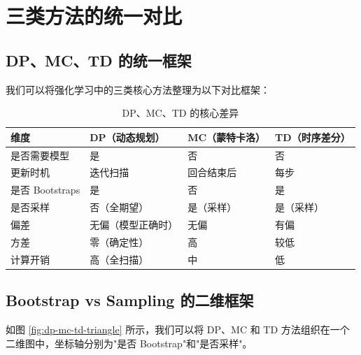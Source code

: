 \section{三类方法的统一对比}

\subsection{DP、MC、TD 的统一框架}

我们可以将强化学习中的三类核心方法整理为以下对比框架：

\begin{table}[H]
\centering
\caption{DP、MC、TD 的核心差异}
\begin{tabular}{@{}p{3cm}p{3.5cm}p{3.5cm}p{3.5cm}@{}}
\toprule
维度 & DP（动态规划） & MC（蒙特卡洛） & TD（时序差分） \\
\midrule
是否需要模型 & 是 & 否 & 否 \\
更新时机 & 迭代扫描 & 回合结束后 & 每步 \\
是否 Bootstraps & 是 & 否 & 是 \\
是否采样 & 否（全期望） & 是（采样） & 是（采样） \\
偏差 & 无偏（模型正确时） & 无偏 & 有偏 \\
方差 & 零（确定性） & 高 & 较低 \\
计算开销 & 高（全扫描） & 中 & 低 \\
\bottomrule
\end{tabular}
\end{table}

\subsection{Bootstrap vs Sampling 的二维框架}

如图 \ref{fig:dp-mc-td-triangle} 所示，我们可以将 DP、MC 和 TD 方法组织在一个二维图中，坐标轴分别为"是否 Bootstrap"和"是否采样"。

